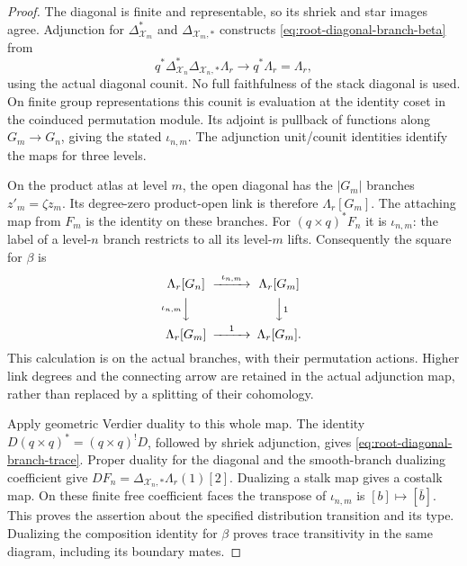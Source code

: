 \documentclass[11pt]{article}
\theoremstyle{definition}
\theoremstyle{remark}
\begin{document}
\begin{proof}
The diagonal is finite and representable, so its shriek and star
images agree.  Adjunction for $\Delta_{\mathcal X_m}^*$ and
$\Delta_{\mathcal X_m,*}$ constructs \eqref{eq:root-diagonal-branch-beta}
from
\[
 q^*\Delta_{\mathcal X_n}^*\Delta_{\mathcal X_n,*}\Lambda_r
       \longrightarrow q^*\Lambda_r=\Lambda_r,
\]
using the actual diagonal counit.  No full faithfulness of the
stack diagonal is used.  On finite group representations this
counit is evaluation at the identity coset in the coinduced
permutation module.  Its adjoint is pullback of functions along
$G_m\to G_n$, giving the stated $\iota_{n,m}$.  The adjunction
unit/counit identities identify the maps for three levels.

On the product atlas at level $m$, the open diagonal has the
$|G_m|$ branches $z'_m=\zeta z_m$.  Its degree-zero product-open
link is therefore $\Lambda_r[G_m]$.  The attaching map from
$F_m$ is the identity on these branches.  For $(q\times q)^*F_n$
it is $\iota_{n,m}$: the label of a level-$n$ branch restricts to
all its level-$m$ lifts.  Consequently the square for $\beta$ is
\[
\begin{CD}
 \Lambda_r[G_n] @>{\iota_{n,m}}>> \Lambda_r[G_m]\\
 @V{\iota_{n,m}}VV @VV{1}V\\
 \Lambda_r[G_m] @>{1}>> \Lambda_r[G_m].
\end{CD}
\]
This calculation is on the actual branches, with their permutation
actions.  Higher link degrees and the connecting arrow are retained
in the actual adjunction map, rather than replaced by a splitting
of their cohomology.

Apply geometric Verdier duality to this whole map.  The identity
$D(q\times q)^*= (q\times q)^!D$, followed by shriek adjunction,
gives \eqref{eq:root-diagonal-branch-trace}.  Proper duality for
the diagonal and the smooth-branch dualizing coefficient give
$D F_n=\Delta_{\mathcal X_n,*}\Lambda_r(1)[2]$.
Dualizing a stalk map gives a costalk map.  On these finite free
coefficient faces the transpose of $\iota_{n,m}$ is
$[b]\mapsto[\bar b]$.  This proves the assertion about the
specified distribution transition and its type.  Dualizing the
composition identity for $\beta$ proves trace transitivity in the
same diagram, including its boundary mates.
\end{proof}
\end{document}

